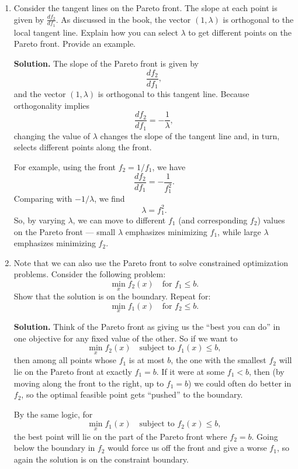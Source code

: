 \documentclass[11pt]{article}
\begin{document}
\begin{enumerate}[label=\textbf{(\alph*)}, leftmargin=1.2cm]
		\noindent\textbf{Solution.}  
		Using scalarization, we minimize the combined objective
		\[
		f_1(x) + \lambda f_2(x),
		\]
		where \(\lambda > 0\) is a weighting factor.  
		
		Taking the gradient and setting it equal to zero gives
		\[
		\nabla f_1(x) + \lambda \nabla f_2(x) = 0.
		\]
		Rearranging, we get the relationship
		\[
		\nabla f_1(x) = -\lambda \nabla f_2(x).
		\]
		This shows that, at any Pareto-optimal point, the gradients of \(f_1\) and \(f_2\) are opposite in direction and scaled by \(\lambda\).  
		
		\item Consider the tangent lines on the Pareto front. The slope at each point is given by $\frac{d f_2}{d f_1}$. As discussed in the book, the vector $(1, \lambda)$ is orthogonal to the local tangent line. Explain how you can select $\lambda$ to get different points on the Pareto front. Provide an example.
		
		\noindent\textbf{Solution.}  
		The slope of the Pareto front is given by 
		\[
		\frac{d f_2}{d f_1},
		\]
		and the vector \((1, \lambda)\) is orthogonal to this tangent line.  
		Because orthogonality implies
		\[
		\frac{d f_2}{d f_1} = -\frac{1}{\lambda},
		\]
		changing the value of \(\lambda\) changes the slope of the tangent line and, in turn, selects different points along the front.  
		
		For example, using the front \(f_2 = 1/f_1\), we have
		\[
		\frac{d f_2}{d f_1} = -\frac{1}{f_1^2}.
		\]
		Comparing with \(-1/\lambda\), we find
		\[
		\lambda = f_1^2.
		\]
		So, by varying \(\lambda\), we can move to different \(f_1\) (and corresponding \(f_2\)) values on the Pareto front — small \(\lambda\) emphasizes minimizing \(f_1\), while large \(\lambda\) emphasizes minimizing \(f_2\).  
		
		\item Note that we can also use the Pareto front to solve constrained optimization problems. Consider the following problem:
		\[
		\min_x f_2(x) \quad \text{for } f_1 \le b.
		\]
		Show that the solution is on the boundary. Repeat for:
		\[
		\min_x f_1(x) \quad \text{for } f_2 \le b.
		\]
		
		\noindent\textbf{Solution.}
		Think of the Pareto front as giving us the “best you can do” in one objective for any fixed value of the other. So if we want to
		\[
		\min_x f_2(x) \quad \text{subject to } f_1(x) \le b,
		\]
		then among all points whose \(f_1\) is at most \(b\), the one with the smallest \(f_2\) will lie on the Pareto front at exactly \(f_1 = b\). If it were at some \(f_1 < b\), then (by moving along the front to the right, up to \(f_1 = b\)) we could often do better in \(f_2\), so the optimal feasible point gets “pushed” to the boundary.
		
		By the same logic, for
		\[
		\min_x f_1(x) \quad \text{subject to } f_2(x) \le b,
		\]
		the best point will lie on the part of the Pareto front where \(f_2 = b\). Going below the boundary in \(f_2\) would force us off the front and give a worse \(f_1\), so again the solution is on the constraint boundary.
		
	\end{enumerate}
	
\end{document}
